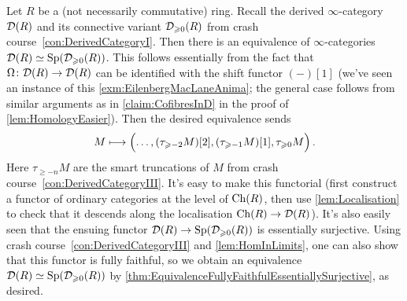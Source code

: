 \begin{exm}\label{exm:EilenbergMacLaneSpectra}
	Let $R$ be a (not necessarily commutative) ring. Recall the derived $\infty$-category $\mathcal{D}(R)$ and its connective variant $\mathcal{D}_{\geqslant 0}(R)$ from crash course~\cref{con:DerivedCategoryI}. Then there is an equivalence of $\infty$-categories $\mathcal{D}(R)\simeq \mathrm{Sp}(\mathcal{D}_{\geqslant 0}(R))$. This follows essentially from the fact that $\Omega\colon \mathcal{D}(R)\rightarrow \mathcal{D}(R)$ can be identified with the shift functor $(-)[1]$ (we've seen an instance of this \cref{exm:EilenbergMacLaneAnima}; the general case follows from similar arguments as in \cref{claim:CofibresInD} in the proof of \cref{lem:HomologyEasier}). Then the desired equivalence sends
	\begin{equation*}
		M\longmapsto\Bigl(\dotsc,(\tau_{\geqslant -2}M)[2],(\tau_{\geqslant -1}M)[1],\tau_{\geqslant 0}M\Bigr)\,.
	\end{equation*}
	Here $\tau_{\geqslant -n}M$ are the smart truncations of $M$ from crash course~\cref{con:DerivedCategoryIII}. It's easy to make this functorial (first construct a functor of ordinary categories at the level of $\operatorname{Ch}(R)$, then use \cref{lem:Localisation} to check that it descends along the localisation $\operatorname{Ch}(R)\rightarrow\mathcal{D}(R)$). It's also easily seen that the ensuing functor $\mathcal{D}(R)\rightarrow \mathrm{Sp}(\mathcal{D}_{\geqslant 0}(R))$ is essentially surjective. Using crash course~\cref{con:DerivedCategoryIII} and \cref{lem:HomInLimits}, one can also show that this functor is fully faithful, so we obtain an equivalence $\mathcal{D}(R)\simeq \mathrm{Sp}(\mathcal{D}_{\geqslant 0}(R))$ by \cref{thm:EquivalenceFullyFaithfulEssentiallySurjective}, as desired.
	

\end{exm}
